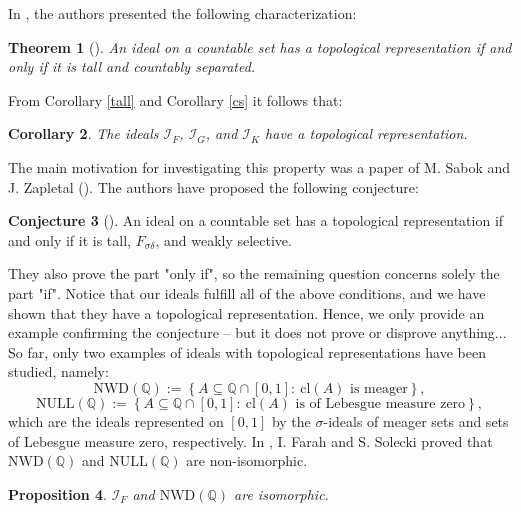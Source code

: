 \documentclass{amsart}
\newtheorem{thm}{Theorem}[section]
\newtheorem{prop}[thm]{Proposition}
\newtheorem{cor}[thm]{Corollary}
\theoremstyle{definition}
\newtheorem{conj}[thm]{Conjecture}
\newcommand{\Q}{{\mathbb Q}}
\newcommand{\I}{\mathcal I}
\newcommand{\NULL}{\mathrm{NULL}}
\newcommand{\NWD}{\mathrm{NWD}}
\newcommand{\cl}{\mathrm{cl}}
\begin{document}
In \cite{Adas}, the authors presented the following characterization: 

\begin{thm}[{\cite[Theorem 1.1]{Adas}}]
An ideal on a countable set has a topological representation if and only if it is tall and countably separated.
\end{thm}

From Corollary \ref{tall} and Corollary \ref{cs} it follows that:

\begin{cor}
The ideals $\I_F$, $\I_G$, and $\I_K$ have a topological representation.
\end{cor}

The main motivation for investigating this property was a paper of M. Sabok and J. Zapletal (\cite{Sabok}). The authors have proposed the following conjecture:

\begin{conj}[\cite{Sabok}]
An ideal on a countable set has a topological representation if and only if it is tall, $F_{\sigma\delta}$, and weakly selective. 
\end{conj}

They also prove the part "only if", so the remaining question concerns solely the part "if".
Notice that our ideals fulfill all of the above conditions, and we have shown that they have a topological representation. Hence, we only provide an example confirming the conjecture -- but it does not prove or disprove anything...\\


So far, only two examples of ideals with topological representations have been studied, namely:
$$\NWD(\Q):=\left\{A\subseteq\mathbb{Q}\cap [0,1] :\ \cl(A) \textrm{ is meager}\right\},$$
$$\NULL(\Q):=\left\{A\subseteq\mathbb{Q}\cap [0,1] :\ \cl(A) \textrm{ is of Lebesgue measure zero}\right\},$$
which are the ideals represented on $[0,1]$ by the $\sigma$-ideals of meager sets and sets of Lebesgue measure zero, respectively. In \cite{FS}, I. Farah and S. Solecki proved that $\NWD(\Q)$ and $\NULL(\Q)$ are non-isomorphic.

\begin{prop}
$\I_F$ and $\NWD(\Q)$ are isomorphic.
\end{prop}
\end{document}
